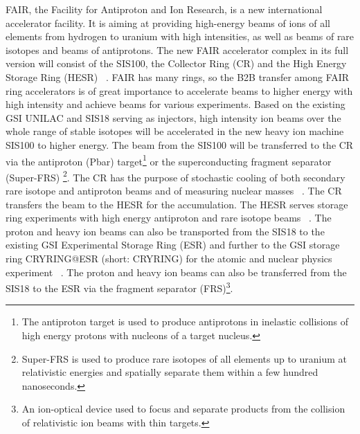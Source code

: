 \gls{FAIR}, the Facility for Antiproton and Ion Research, is a new international accelerator facility. It is aiming at providing high-energy beams of ions of all elements from hydrogen to uranium with high intensities, as well as beams of rare isotopes
and beams of antiprotons. The new FAIR accelerator complex in its full version will consist of the \gls{SIS100}, the Collector Ring (\gls{CR}) and the High Energy Storage Ring (\gls{HESR}) ~\cite{spiller_fair_2006, steck_advanced_2009}. FAIR has many rings, so the B2B transfer among FAIR ring accelerators is of great importance to accelerate beams to higher energy with high intensity and achieve beams for various experiments. Based on the existing GSI \gls{UNILAC} and \gls{SIS18} serving as injectors, high intensity ion beams over the whole range of stable isotopes will be accelerated in the new heavy ion machine SIS100 to higher energy. The beam from the SIS100 will be transferred to the CR via the antiproton (\gls{Pbar}) target\footnote{The antiproton target is used to produce antiprotons in inelastic collisions of high energy protons with nucleons of a target nucleus.} or the superconducting fragment separator (Super-FRS) \footnote{Super-FRS is used to produce rare isotopes of all elements up to uranium at relativistic energies and spatially separate them within a few hundred nanoseconds.}. The CR has the purpose of stochastic cooling of both secondary rare isotope and antiproton beams and of measuring nuclear masses ~\cite{nolden_collector_2006, bar_technical_2013}. The CR transfers the beam to the HESR for the accumulation. The HESR serves storage ring experiments with high energy antiproton and rare isotope beams ~\cite{toelle_hesr_2007}. The proton and heavy ion beams can also be transported from the SIS18 to the existing GSI Experimental Storage Ring (\gls{ESR}) and further to the GSI storage ring CRYRING@ESR (short: CRYRING) for the atomic and nuclear physics experiment ~\cite{lestinsky_cryring_2015, lestinsky_cryring_2012}. The proton and heavy ion beams can also be transferred from the SIS18 to the ESR via the fragment separator (\gls{FRS})\footnote{An ion-optical device used to focus and separate products from the collision of relativistic ion beams with thin targets.}.

